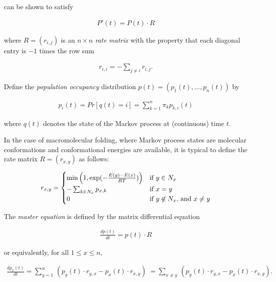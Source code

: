can be shown to satisfy

\begin{align}
P'(t) = P(t) \cdot R
\end{align}

where $R = (r_{i,j})$ is an $n \times n$ {\em rate matrix} with the
property that each diagonal entry is $-1$ times the row sum

\begin{align}
r_{i,i} = - \sum_{j\ne i} r_{i,j}.
\end{align}

Define the {\em population occupancy} distribution
$p(t) = (p_1(t),\dots,p_n(t))$ by

\begin{align}
\label{eq:hermes:markovProcessPopulationFreq}
p_i(t) = Pr[q(t) = i] = \sum_{k=1}^n\pi_k p_{k,i}(t)
\end{align}

where $q(t)$ denotes the state of the Markov process
at (continuous) time $t$.

In the case of macromolecular folding, where Markov process states
are molecular conformations and conformational energies are available,
it is typical to define the rate matrix
$R = (r_{x,y})$ as follows:

\begin{align}
\label{eq:hermes:eqXitionRate}
r_{x,y} =
\begin{cases}
\min\left( 1, \boltzYmX \right)
& \text{if $y \in N_x$} \\
-\sum_{k \in N_x} p_{x,k} & \text{if $x=y$} \\
0 & \text{if $y \not\in N_x$, and $x \ne y$} \\
\end{cases}
\end{align}

The {\em master equation} is defined by the matrix differential equation

\begin{align}
\label{eq:hermes:masterEquationMatrix}
\frac{d p(t)}{dt} = p(t) \cdot R
\end{align}

or equivalently, for all $1 \leq x \leq n$,

\begin{align}
\label{eq:hermes:masterEquation}
\frac{d p_x(t)}{dt} = \sum_{y=1}^n\, (p_y(t) \cdot r_{y,x} - p_x(t) \cdot
r_{x,y})\; = \sum_{x \ne y}\, (p_y(t) \cdot r_{y,x} - p_x(t) \cdot r_{x,y}).
\end{align}

